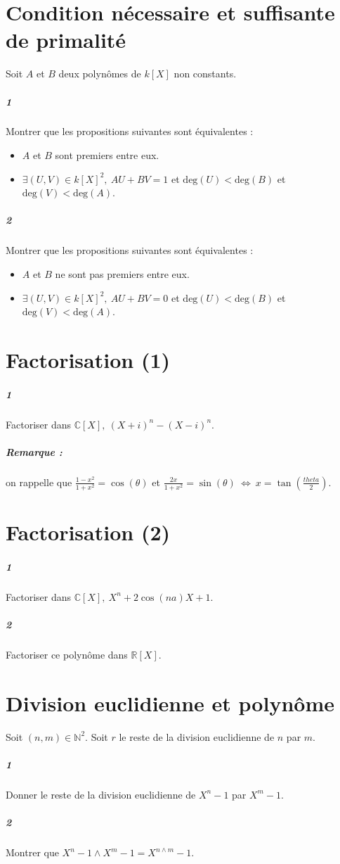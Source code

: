 \documentclass[10pt,a4paper]{article}
\begin{document}
\section{Condition nécessaire et suffisante de primalité}
Soit $A$ et $B$ deux polynômes de $k[X]$ non constants.
\subparagraph{1} Montrer que les propositions suivantes sont équivalentes :
\begin{itemize}
\item $A$ et $B$ sont premiers entre eux.
\item $\exists (U,V) \in k[X]^2, \ AU+BV = 1$ et $\text{deg}(U)<\text{deg}(B)$ et $\text{deg}(V)<\text{deg}(A)$.
\end{itemize}
\subparagraph{2} Montrer que les propositions suivantes sont équivalentes :
\begin{itemize}
\item $A$ et $B$ ne sont pas premiers entre eux.
\item $\exists (U,V) \in k[X]^2, \ AU+BV = 0$ et $\text{deg}(U)<\text{deg}(B)$ et $\text{deg}(V)<\text{deg}(A)$.
\end{itemize}

\section{Factorisation (1)}
\subparagraph{1}Factoriser dans $\mathbb{C}[X], \ (X+i)^n-(X-i)^n$.
\subparagraph{Remarque : } on rappelle que $\frac{1-x^2}{1+x^2}=\cos(\theta)$ et $\frac{2x}{1+x^2}=\sin(\theta) \ \Leftrightarrow \ x=\tan(\frac{theta}{2})$.

\section{Factorisation (2)}
\subparagraph{1}Factoriser dans $\mathbb{C}[X], \ X^n+2\cos(na)X+1$.
\subparagraph{2}Factoriser ce polynôme dans $\mathbb{R}[X]$.

\section{Division euclidienne et polynôme}
Soit $(n,m)\in \mathbb{N}^2$. Soit $r$ le reste de la division euclidienne de $n$ par $m$.
\subparagraph{1} Donner le reste de la division euclidienne de $X^n-1$ par $X^m-1$.
\subparagraph{2} Montrer que $X^n-1 \wedge X^m-1 = X^{n \wedge m}-1$.
\end{document}
